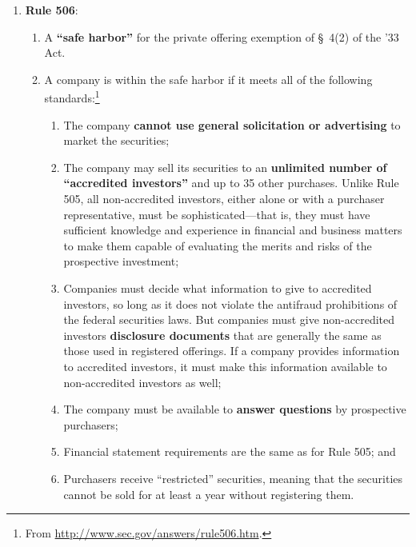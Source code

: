 \begin{enumerate}
\begin{enumerate}
{        v. Glynn} (asserting a 10b-5 violation; the issue was whether 
        the interest was a security).
        \item 
    \end{enumerate}
    \item \textbf{Rule 506}:
    \begin{enumerate}
        \item A \textbf{``safe harbor''} for the private offering exemption of 
        \S\ 4(2) of the '33 Act.
        \item A company is within the safe harbor if it meets all of the 
        following standards:\footnote{From 
        \url{http://www.sec.gov/answers/rule506.htm}.}
        \begin{enumerate}
            \item The company \textbf{cannot use general solicitation or 
            advertising} to market the securities;
            \item The company may sell its securities to an \textbf{unlimited 
            number of ``accredited investors''} and up to 35 other purchases. 
            Unlike Rule 505, all non-accredited investors, either alone or 
            with a purchaser representative, must be sophisticated---that is, 
            they must have sufficient knowledge and experience in financial 
            and business matters to make them capable of evaluating the merits 
            and risks of the prospective investment;
            \item Companies must decide what information to give to accredited 
            investors, so long as it does not violate the antifraud 
            prohibitions of the federal securities laws. But companies must 
            give non-accredited investors \textbf{disclosure documents} that 
            are generally the same as those used in registered offerings. If a 
            company provides information to accredited investors, it must make 
            this information available to non-accredited investors as well;
            \item The company must be available to \textbf{answer questions} 
            by prospective purchasers;
            \item Financial statement requirements are the same as for Rule 
            505; and
            \item Purchasers receive ``restricted'' securities, meaning that 
            the securities cannot be sold for at least a year without 
            registering them.

\end{enumerate}
\end{enumerate}
\end{enumerate}

